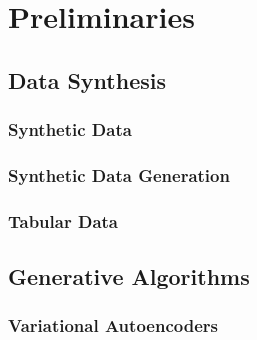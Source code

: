 \chapter{Preliminaries}
\label{ch:preliminaries}

\section{Data Synthesis}
\label{ch:preliminaries-dataSynthesis}

\subsection{Synthetic Data}
\label{ch:preliminaries-dataSynthesis-syntheticData}



\subsection{Synthetic Data Generation}
\label{ch:preliminaries-dataSynthesis-syntheticDataGeneration}


\subsection{Tabular Data}
\label{ch:preliminaries-dataSynthesis-tabularData}



\section{Generative Algorithms}
\label{ch:preliminaries-generativeAlgorithms}

\subsection{Variational Autoencoders}
\label{ch:preliminaries-generativeAlgorithms-variationalAutoencoders}

